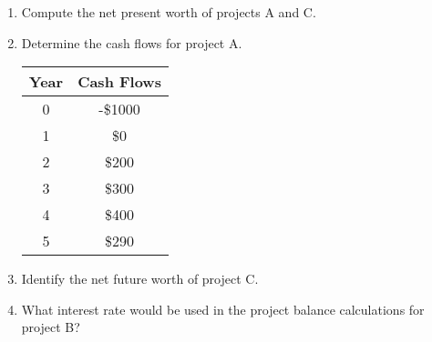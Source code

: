 \documentclass[../INDE250HW.tex]{subfiles}
\begin{document}
\begin{enumerate}
    \item Compute the net present worth of projects A and C. \\
    \begin{center}
    \end{center}
    \item Determine the cash flows for project A. 
    \begin{center}
        \begin{tabular}{ c c }
            Year & Cash Flows \\
            \hline
            0   &   -\$1000 \\
            1   &   \$0 \\
            2   &   \$200 \\
            3   &   \$300 \\
            4   &   \$400 \\
            5   &   \$290
        \end{tabular}
    \end{center}
    \item Identify the net future worth of project C.
    \begin{center}
    \end{center}
    \item What interest rate would be used in the project balance calculations for project B?
    \begin{center}
    \end{center}
\end{enumerate}
\end{document}
